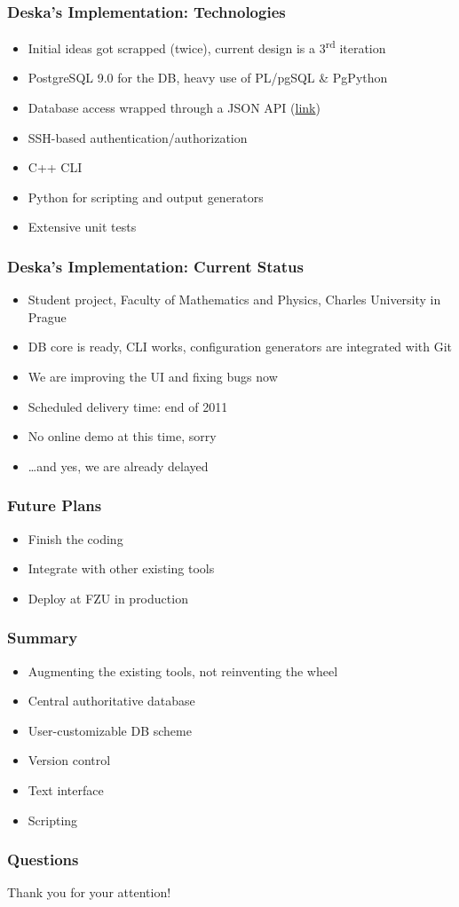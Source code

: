 \documentclass{beamer}
\begin{document}
\begin{frame}[fragile]
\frametitle{Deska's Implementation: Technologies}
\begin{itemize}
    \item Initial ideas got scrapped (twice), current design is a 3\textsuperscript{rd} iteration
    \item PostgreSQL 9.0 for the DB, heavy use of PL/pgSQL \& PgPython
    \item Database access wrapped through a JSON API
            (\href{https://projects.flaska.net/attachments/download/71/2011-10-23-dbapi-protocol-10f3789.pdf}{link})
    \item SSH-based authentication/authorization
    \item C++ CLI
    \item Python for scripting and output generators
    \item Extensive unit tests
\end{itemize}
\end{frame}

\begin{frame}[fragile]
\frametitle{Deska's Implementation: Current Status}
\begin{itemize}
    \item Student project, Faculty of Mathematics and Physics, Charles
        University in Prague
    \item DB core is ready, CLI works, configuration generators are integrated with Git
    \item We are improving the UI and fixing bugs now
    \item Scheduled delivery time: end of 2011
    \item No online demo at this time, sorry
    \item \ldots and yes, we are already delayed
\end{itemize}
\end{frame}

\begin{frame}[fragile]
\frametitle{Future Plans}
\begin{itemize}
    \item Finish the coding
    \item Integrate with other existing tools
    \item Deploy at FZU in production
\end{itemize}
\end{frame}

\begin{frame}[fragile]
\frametitle{Summary}
\begin{itemize}
    \item Augmenting the existing tools, not reinventing the wheel
    \item Central authoritative database
    \item User-customizable DB scheme
    \item Version control
    \item Text interface
    \item Scripting
\end{itemize}
\end{frame}

\begin{frame}[fragile]
\frametitle{Questions}
\begin{center}
Thank you for your attention!
\end{center}
\end{frame}
\end{document}
